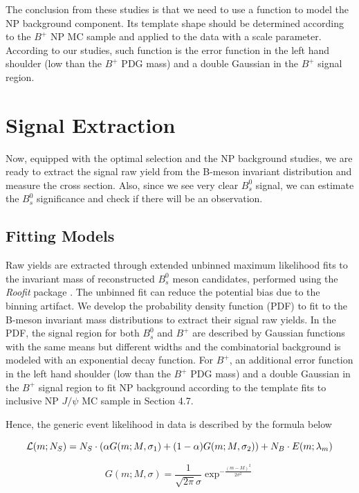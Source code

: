 The conclusion from these studies is that we need to use a function to model the NP background component. Its template shape should be determined according to the $B^+$ NP MC sample and applied to the data with a scale parameter. According to our studies, such function is the error function in the left hand shoulder (low than the $B^+$ PDG mass) and a double Gaussian in the $B^+$ signal region.

\section{Signal Extraction} 

Now, equipped with the optimal selection and the NP background studies, we are ready to extract the signal raw yield from the B-meson invariant distribution and measure the cross section. Also, since we see very clear $B^0_s$ signal, we can estimate the $B^0_s$ significance and check if there will be an observation.

\subsection{Fitting Models}

Raw yields are extracted through extended unbinned maximum likelihood fits to the invariant mass of reconstructed $B^0_s$ meson candidates, performed using the \textit{Roofit} package \cite{ROOFIT}. The unbinned fit can reduce the potential bias due to the binning artifact. We develop the probability density function (PDF) to fit to the B-meson invariant mass distributions to extract their signal raw yields. In the PDF, the signal region for both $B^0_s$ and $B^+$ are described by Gaussian functions with the same means but different widths and the combinatorial background is modeled with an exponential decay function. For $B^+$, an additional error function in the left hand shoulder (low than the $B^+$ PDG mass) and a double Gaussian in the $B^+$ signal region to fit NP background according to the template fits to inclusive NP $J/\psi$ MC sample in Section 4.7. 

Hence, the generic event likelihood in data is described by the formula below

\begin{equation}
{\cal{L}}(m;N_S) = N_S \cdot (\alpha G(m;M,\sigma_1) + (1-\alpha) G(m; M,\sigma_2))+ N_B \cdot E(m;\lambda_m)
\end{equation}

\begin{equation}
G(m;M,\sigma) = \frac{1}{\sqrt{2\pi}\sigma} \exp^{-\frac{(m-M)^2}{2\sigma^2}}
\end{equation}

